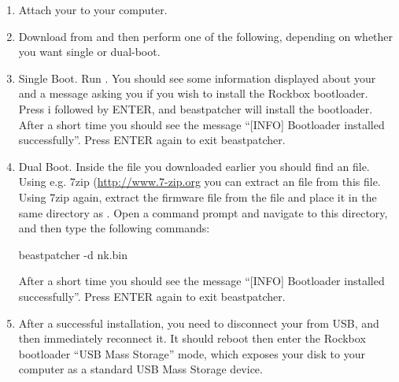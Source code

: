 \begin{enumerate}

\item Attach your \dap{} to your computer.

\item Download  from
and then perform one of the following, depending on whether you want single
or dual-boot.

\item Single Boot. Run . You should see some
information displayed about
your \dap{} and a message asking you if you wish to install the Rockbox
bootloader. Press i followed by ENTER, and beastpatcher will
install the bootloader. After a short time you should see the message
``[INFO] Bootloader installed successfully''. Press ENTER again to exit
beastpatcher.

\item Dual Boot. Inside the  file you downloaded earlier
you should find an  file.  Using e.g. 7zip
(\url{http://www.7-zip.org} you can extract an  file from this
 file.  Using 7zip again, extract the \playerman{} firmware file
 from the  file and place it in the same
directory as .  Open a command prompt and navigate
to this directory, and then type the following commands:

\begin{code} 
    beastpatcher -d nk.bin
\end{code}

After a short time you should see the message
``[INFO] Bootloader installed successfully''. Press ENTER again to exit
beastpatcher.

\item After a successful installation, you need to disconnect your \dap{} from
USB, and then immediately reconnect it. It should reboot then enter the Rockbox
bootloader ``USB Mass Storage'' mode, which exposes your \daps{} disk to your
computer as a standard USB Mass Storage device.
\end{enumerate}

